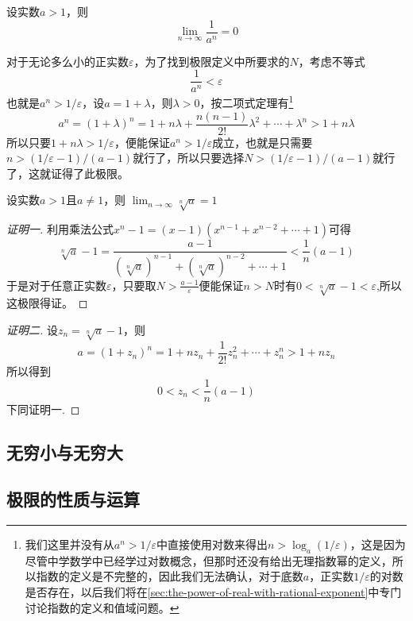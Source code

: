\begin{example}
  设实数$a>1$，则
  \[ \lim_{n \to \infty} \frac{1}{a^n} = 0 \]

  对于无论多么小的正实数$\varepsilon$，为了找到极限定义中所要求的$N$，考虑不等式
  \[ \frac{1}{a^n} < \varepsilon \]
  也就是$a^n>1/\varepsilon$，设$a=1+\lambda$，则$\lambda>0$，按二项式定理有\footnote{我们这里并没有从$a^n>1/\varepsilon$中直接使用对数来得出$n>\log_a{(1/\varepsilon)}$，这是因为尽管中学数学中已经学过对数概念，但那时还没有给出无理指数幂的定义，所以指数的定义是不完整的，因此我们无法确认，对于底数$a$，正实数$1/\varepsilon$的对数是否存在，以后我们将在\autoref{sec:the-power-of-real-with-rational-exponent}中专门讨论指数的定义和值域问题。}
  \[ a^n = (1+\lambda)^n = 1 + n\lambda + \frac{n(n-1)}{2!}\lambda^2+\cdots+\lambda^n > 1+n \lambda \]
  所以只要$1+n\lambda>1/\varepsilon$，便能保证$a^n>1/\varepsilon$成立，也就是只需要$n > (1/\varepsilon-1) / (a-1)$就行了，所以只要选择$N>(1/\varepsilon-1)/(a-1)$就行了，这就证得了此极限。
\end{example}

\begin{example}
  \label{example:limit-of-n-sqrt-a-when-a-greater-than-1}
  设实数$a>1$且$a \neq 1$，则 $\lim_{n \to \infty} \sqrt[n]{a} = 1$

  \begin{proof}[证明一]
    利用乘法公式$x^n-1=(x-1)(x^{n-1}+x^{n-2}+\cdots+1)$可得
    \[ \sqrt[n]{a}-1 = \frac{a-1}{(\sqrt[n]{a})^{n-1}+(\sqrt[n]{a})^{n-2}+\cdots+1} < \frac{1}{n}(a-1) \]
   于是对于任意正实数$\varepsilon$，只要取$N>\frac{a-1}{\varepsilon}$便能保证$n>N$时有$0<\sqrt[n]{a}-1<\varepsilon$,所以这极限得证。
  \end{proof}

  \begin{proof}[证明二]
    设$z_n=\sqrt[n]{a}-1$，则
    \[ a = (1+z_n)^n = 1+ nz_n+\frac{1}{2!}z_n^2+\cdots+z_n^n > 1+ n z_n \]
    所以得到
    \[ 0<z_n<\frac{1}{n}(a-1) \]
    下同证明一.
  \end{proof}
\end{example}


\subsection{无穷小与无穷大}
\label{sec:infinite-small-and-great}

\subsection{极限的性质与运算}
\label{sec:properties-and-operation-of-limit}

